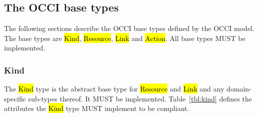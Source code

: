 \documentclass[10pt,a4paper,british]{article}
\begin{document}

\subsection{The OCCI base types}
\label{sec:base_types}
The following sections describe the OCCI base types defined by the OCCI model.
The base types are \hl{Kind}, \hl{Resource}, \hl{Link} and \hl{Action}. All
base types MUST be implemented.

\subsubsection{Kind}
\label{sec:kind}
The \hl{Kind} type is the abstract base type for \hl{Resource} and \hl{Link}
and any domain-specific sub-types thereof. It MUST be implemented.
%
Table~\ref{tbl:kind} defines the attributes the \hl{Kind} type MUST implement to
be compliant.
\end{document}
